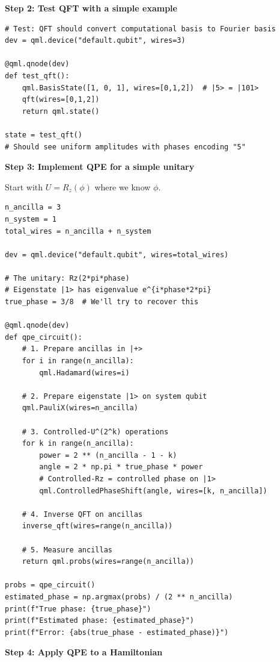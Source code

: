 \documentclass[11pt,a4paper]{article}
\begin{document}
\textbf{Step 2: Test QFT with a simple example}
\begin{lstlisting}
# Test: QFT should convert computational basis to Fourier basis
dev = qml.device("default.qubit", wires=3)

@qml.qnode(dev)
def test_qft():
    qml.BasisState([1, 0, 1], wires=[0,1,2])  # |5> = |101>
    qft(wires=[0,1,2])
    return qml.state()

state = test_qft()
# Should see uniform amplitudes with phases encoding "5"
\end{lstlisting}

\textbf{Step 3: Implement QPE for a simple unitary}

Start with $U = R_z(\phi)$ where we know $\phi$.
\begin{lstlisting}
n_ancilla = 3
n_system = 1
total_wires = n_ancilla + n_system

dev = qml.device("default.qubit", wires=total_wires)

# The unitary: Rz(2*pi*phase)
# Eigenstate |1> has eigenvalue e^{i*phase*2*pi}
true_phase = 3/8  # We'll try to recover this

@qml.qnode(dev)
def qpe_circuit():
    # 1. Prepare ancillas in |+>
    for i in range(n_ancilla):
        qml.Hadamard(wires=i)
    
    # 2. Prepare eigenstate |1> on system qubit
    qml.PauliX(wires=n_ancilla)
    
    # 3. Controlled-U^(2^k) operations
    for k in range(n_ancilla):
        power = 2 ** (n_ancilla - 1 - k)
        angle = 2 * np.pi * true_phase * power
        # Controlled-Rz = controlled phase on |1>
        qml.ControlledPhaseShift(angle, wires=[k, n_ancilla])
    
    # 4. Inverse QFT on ancillas
    inverse_qft(wires=range(n_ancilla))
    
    # 5. Measure ancillas
    return qml.probs(wires=range(n_ancilla))

probs = qpe_circuit()
estimated_phase = np.argmax(probs) / (2 ** n_ancilla)
print(f"True phase: {true_phase}")
print(f"Estimated phase: {estimated_phase}")
print(f"Error: {abs(true_phase - estimated_phase)}")
\end{lstlisting}

\textbf{Step 4: Apply QPE to a Hamiltonian}
\end{document}
